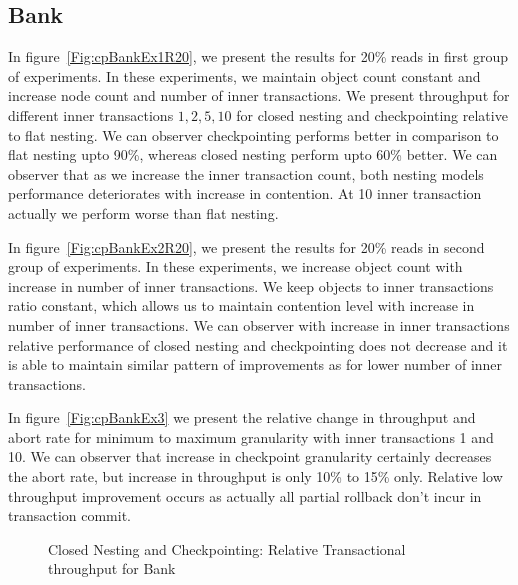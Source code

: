 \documentclass[12pt,english]{report}
\begin{document}
\subsection{Bank}
In figure~\ref{Fig:cpBankEx1R20}, we present the results for 20\% reads in first group of experiments. In these experiments, we maintain object count constant and increase node count and number of inner transactions. We present throughput for different inner transactions ${1, 2, 5, 10}$ for closed nesting and checkpointing relative to flat nesting. We can observer checkpointing performs better in comparison to flat nesting upto 90\%, whereas closed nesting perform upto 60\% better. We can observer that as we increase the inner transaction count, both nesting models performance deteriorates with increase in contention. At 10 inner transaction actually we perform worse than flat nesting.

In figure~\ref{Fig:cpBankEx2R20}, we present the results for 20\% reads in second group of experiments. In these experiments, we increase object count with increase in number of inner transactions. We keep objects to inner transactions ratio constant, which allows us to maintain contention level with increase in number of inner transactions. We can observer with increase in inner transactions relative performance of closed nesting and checkpointing does not decrease and it is able to maintain similar pattern of improvements as for lower number of inner transactions.

In figure~\ref{Fig:cpBankEx3} we present the relative change in throughput and abort rate for minimum to maximum granularity with inner transactions 1 and 10. We can observer that increase in checkpoint granularity certainly decreases the abort rate, but increase in throughput is only 10\% to 15\% only. Relative low throughput improvement occurs as actually all partial rollback don't incur in transaction commit.

\begin{figure}[H]
\centering
{}
\end{figure}
\begin{figure}[H]
\centering
{}
\end{figure}
\begin{figure}[H]
\centering
{}
\caption{Closed Nesting and Checkpointing: Relative Transactional throughput for Bank}
\label{Fig:cpBank}
\end{figure}
\end{document}
